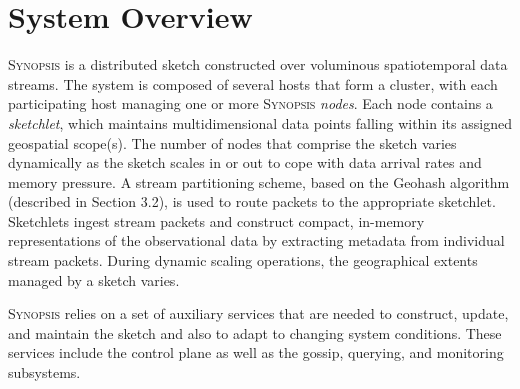 \section{System Overview}
\label{sec:system}
\textsc{Synopsis} is a distributed sketch constructed over voluminous spatiotemporal data streams.
The system is composed of several hosts that form a cluster, with each participating host managing one or more \textsc{Synopsis} \emph{nodes}.
Each node contains a \emph{sketchlet}, which maintains multidimensional data points falling within its assigned geospatial scope(s).
The number of nodes that comprise the sketch varies dynamically as the sketch scales in or out to cope with data arrival rates and memory pressure.
A stream partitioning scheme, based on the Geohash algorithm (described in Section 3.2), is used to route packets to the appropriate sketchlet.
Sketchlets ingest stream packets and construct compact, in-memory representations of the observational data by extracting metadata from individual stream packets.
During dynamic scaling operations, the geographical extents managed by a sketch varies.

\textsc{Synopsis} relies on a set of auxiliary services that are needed to construct, update, and maintain the sketch and also to adapt to changing system conditions.
These services include the control plane as well as the gossip, querying, and monitoring subsystems.

